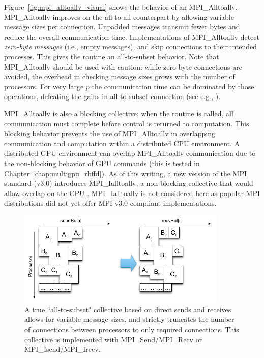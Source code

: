 \documentclass{report}
\begin{document}
Figure~\ref{fig:mpi_alltoallv_visual} shows the behavior of an MPI\_Alltoallv. MPI\_Alltoallv improves on the all-to-all counterpart by allowing variable message sizes per connection. Unpadded messages transmit fewer bytes and reduce the overall communication time. Implementations of MPI\_Alltoallv detect \emph{zero-byte messages} (i.e., empty messages), and skip connections to their intended processes. This gives the routine an all-to-subset behavior. Note that MPI\_Alltoallv should be used with caution: while zero-byte connections are avoided, the overhead in checking message sizes grows with the number of processors. For very large $p$ the communication time can be dominated by those operations, defeating the gains in all-to-subset connection (see e.g., \cite{Balaji2010}). 


%

MPI\_Alltoallv is also a blocking collective: when the routine is called, all communication must complete before control is returned to computation. This blocking behavior prevents the use of MPI\_Alltoallv in overlapping communication and computation within a distributed CPU environment. A distributed GPU environment can overlap MPI\_Alltoallv communication due to the non-blocking behavior of GPU commands (this is tested in Chapter~\ref{chap:multigpu_rbffd}). As of this writing, a new version of the MPI standard (v3.0) introduces MPI\_Ialltoallv, a non-blocking collective that would allow overlap on the CPU \cite{MPI}. MPI\_Ialltoallv is not considered here as popular MPI distributions did not yet offer MPI v3.0 compliant implementations.

\begin{figure}
\centering
\includegraphics[width=10cm]{../figures/omnigraffle/MPI_IsendIrecv_Visual.png}
\caption{A true ``all-to-subset" collective based on direct sends and receives allows for variable message sizes, and strictly truncates the number of connections between processors to only required connections. This collective is implemented with MPI\_Send/MPI\_Recv or MPI\_Isend/MPI\_Irecv.}
\label{fig:mpi_isendirecv_visual}
\end{figure}
\end{document}
